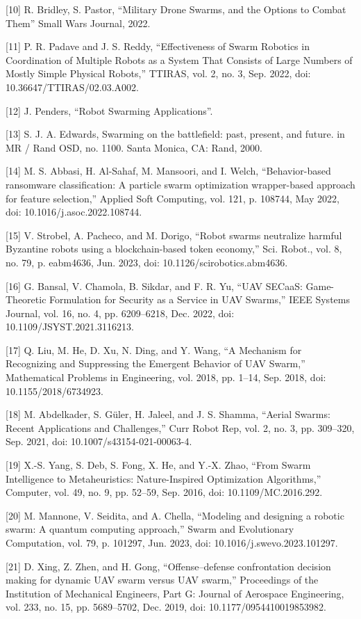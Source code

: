 [10] R. Bridley, S. Pastor, “Military Drone Swarms, and the Options to Combat Them” Small Wars Journal, 2022.


[11] P. R. Padave and J. S. Reddy, “Effectiveness of Swarm Robotics in Coordination of Multiple Robots as a System That Consists of Large Numbers of Mostly Simple Physical Robots,” TTIRAS, vol. 2, no. 3, Sep. 2022, doi: 10.36647/TTIRAS/02.03.A002.


[12] J. Penders, “Robot Swarming Applications”.


[13] S. J. A. Edwards, Swarming on the battlefield: past, present, and future. in MR / Rand OSD, no. 1100. Santa Monica, CA: Rand, 2000.


[14] M. S. Abbasi, H. Al-Sahaf, M. Mansoori, and I. Welch, “Behavior-based ransomware classification: A particle swarm optimization wrapper-based approach for feature selection,” Applied Soft Computing, vol. 121, p. 108744, May 2022, doi: 10.1016/j.asoc.2022.108744.


[15] V. Strobel, A. Pacheco, and M. Dorigo, “Robot swarms neutralize harmful Byzantine robots using a blockchain-based token economy,” Sci. Robot., vol. 8, no. 79, p. eabm4636, Jun. 2023, doi: 10.1126/scirobotics.abm4636.


[16] G. Bansal, V. Chamola, B. Sikdar, and F. R. Yu, “UAV SECaaS: Game-Theoretic Formulation for Security as a Service in UAV Swarms,” IEEE Systems Journal, vol. 16, no. 4, pp. 6209–6218, Dec. 2022, doi: 10.1109/JSYST.2021.3116213.


[17] Q. Liu, M. He, D. Xu, N. Ding, and Y. Wang, “A Mechanism for Recognizing and Suppressing the Emergent Behavior of UAV Swarm,” Mathematical Problems in Engineering, vol. 2018, pp. 1–14, Sep. 2018, doi: 10.1155/2018/6734923.


[18] M. Abdelkader, S. Güler, H. Jaleel, and J. S. Shamma, “Aerial Swarms: Recent Applications and Challenges,” Curr Robot Rep, vol. 2, no. 3, pp. 309–320, Sep. 2021, doi: 10.1007/s43154-021-00063-4.


[19] X.-S. Yang, S. Deb, S. Fong, X. He, and Y.-X. Zhao, “From Swarm Intelligence to Metaheuristics: Nature-Inspired Optimization Algorithms,” Computer, vol. 49, no. 9, pp. 52–59, Sep. 2016, doi: 10.1109/MC.2016.292.


[20] M. Mannone, V. Seidita, and A. Chella, “Modeling and designing a robotic swarm: A quantum computing approach,” Swarm and Evolutionary Computation, vol. 79, p. 101297, Jun. 2023, doi: 10.1016/j.swevo.2023.101297.


[21] D. Xing, Z. Zhen, and H. Gong, “Offense–defense confrontation decision making for dynamic UAV swarm versus UAV swarm,” Proceedings of the Institution of Mechanical Engineers, Part G: Journal of Aerospace Engineering, vol. 233, no. 15, pp. 5689–5702, Dec. 2019, doi: 10.1177/0954410019853982.


